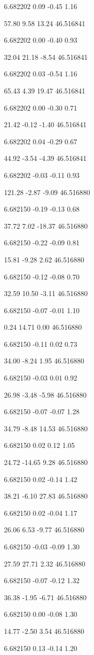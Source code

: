 6.682202
0.09
-0.45
1.16

57.80
9.58
13.24
46.516841

6.682202
0.00
-0.40
0.93

32.04
21.18
-8.54
46.516841

6.682202
0.03
-0.54
1.16

65.43
4.39
19.47
46.516841

6.682202
0.00
-0.30
0.71

21.42
-0.12
-1.40
46.516841

6.682202
0.04
-0.29
0.67

44.92
-3.54
-4.39
46.516841

6.682202
-0.03
-0.11
0.93

121.28
-2.87
-9.09
46.516880

6.682150
-0.19
-0.13
0.68

37.72
7.02
-18.37
46.516880

6.682150
-0.22
-0.09
0.81

15.81
-9.28
2.62
46.516880

6.682150
-0.12
-0.08
0.70

32.59
10.50
-3.11
46.516880

6.682150
-0.07
-0.01
1.10

0.24
14.71
0.00
46.516880

6.682150
-0.11
0.02
0.73

34.00
-8.24
1.95
46.516880

6.682150
-0.03
0.01
0.92

26.98
-3.48
-5.98
46.516880

6.682150
-0.07
-0.07
1.28

34.79
-8.48
14.53
46.516880

6.682150
0.02
0.12
1.05

24.72
-14.65
9.28
46.516880

6.682150
0.02
-0.14
1.42

38.21
-6.10
27.83
46.516880

6.682150
0.02
-0.04
1.17

26.06
6.53
-9.77
46.516880

6.682150
-0.03
-0.09
1.30

27.59
27.71
2.32
46.516880

6.682150
-0.07
-0.12
1.32

36.38
-1.95
-6.71
46.516880

6.682150
0.00
-0.08
1.30

14.77
-2.50
3.54
46.516880

6.682150
0.13
-0.14
1.20

